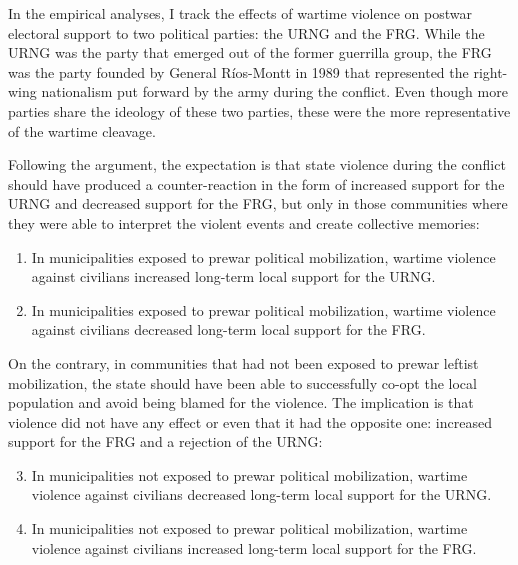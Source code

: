 \documentclass[12pt, notitlepage]{article}
\begin{document}
In the empirical analyses, I track the effects of wartime violence on postwar electoral support to two political parties: the URNG and the FRG.
While the URNG was the party that emerged out of the former guerrilla group, the FRG was the party founded by General Ríos-Montt in 1989 that represented the right-wing nationalism put forward by the army during the conflict.
Even though more parties share the ideology of these two parties, these were the more representative of the wartime cleavage.

Following the argument, the expectation is that state violence during the conflict should have produced a counter-reaction in the form of increased support for the URNG and decreased support for the FRG, but only in those communities where they were able to interpret the violent events and create collective memories:

\begin{enumerate}[label={\bf H\arabic*:} , ref=H\arabic* , wide=0.5em, leftmargin=*]
  \item \label{h:URNG-mob} In municipalities exposed to prewar political mobilization, wartime violence against civilians increased long-term local support for the URNG.
  \item \label{h:FRG-mob} In municipalities exposed to prewar political mobilization, wartime violence against civilians decreased long-term local support for the FRG.
\end{enumerate}

On the contrary, in communities that had not been exposed to prewar leftist mobilization, the state should have been able to successfully co-opt the local population and avoid being blamed for the violence.
The implication is that violence did not have any effect or even that it had the opposite one: increased support for the FRG and a rejection of the URNG:

\begin{enumerate}[label={\bf H\arabic*:} , ref=H\arabic* , wide=0.5em, leftmargin=*]
  \setcounter{enumi}{2}
  \item \label{h:URNG-no-mob} In municipalities not exposed to prewar political mobilization, wartime violence against civilians decreased long-term local support for the URNG.
  \item \label{h:FRG-no-mob} In municipalities not exposed to prewar political mobilization, wartime violence against civilians increased long-term local support for the FRG.
\end{enumerate}
\end{document}
